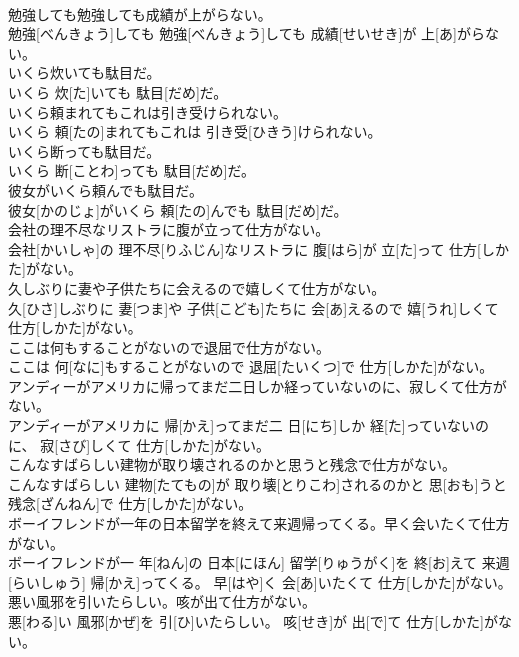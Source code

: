 \documentclass[8pt]{extreport}
\begin{document}
\begin{CJK}{UTF8}{min}
\\	勉強しても勉強しても成績が上がらない。	
\\	勉強[べんきょう]しても 勉強[べんきょう]しても 成績[せいせき]が 上[あ]がらない。
\\	いくら炊いても駄目だ。	
\\	いくら 炊[た]いても 駄目[だめ]だ。
\\	いくら頼まれてもこれは引き受けられない。	
\\	いくら 頼[たの]まれてもこれは 引き受[ひきう]けられない。
\\	いくら断っても駄目だ。	
\\	いくら 断[ことわ]っても 駄目[だめ]だ。
\\	彼女がいくら頼んでも駄目だ。	
\\	彼女[かのじょ]がいくら 頼[たの]んでも 駄目[だめ]だ。
\\	会社の理不尽なリストラに腹が立って仕方がない。	
\\	会社[かいしゃ]の 理不尽[りふじん]なリストラに 腹[はら]が 立[た]って 仕方[しかた]がない。
\\	久しぶりに妻や子供たちに会えるので嬉しくて仕方がない。	
\\	久[ひさ]しぶりに 妻[つま]や 子供[こども]たちに 会[あ]えるので 嬉[うれ]しくて 仕方[しかた]がない。
\\	ここは何もすることがないので退屈で仕方がない。	
\\	ここは 何[なに]もすることがないので 退屈[たいくつ]で 仕方[しかた]がない。
\\	アンディーがアメリカに帰ってまだ二日しか経っていないのに、寂しくて仕方がない。	
\\	アンディーがアメリカに 帰[かえ]ってまだ二 日[にち]しか 経[た]っていないのに、 寂[さび]しくて 仕方[しかた]がない。
\\	こんなすばらしい建物が取り壊されるのかと思うと残念で仕方がない。	
\\	こんなすばらしい 建物[たてもの]が 取り壊[とりこわ]されるのかと 思[おも]うと 残念[ざんねん]で 仕方[しかた]がない。
\\	ボーイフレンドが一年の日本留学を終えて来週帰ってくる。早く会いたくて仕方がない。	
\\	ボーイフレンドが一 年[ねん]の 日本[にほん] 留学[りゅうがく]を 終[お]えて 来週[らいしゅう] 帰[かえ]ってくる。 早[はや]く 会[あ]いたくて 仕方[しかた]がない。
\\	悪い風邪を引いたらしい。咳が出て仕方がない。	
\\	悪[わる]い 風邪[かぜ]を 引[ひ]いたらしい。 咳[せき]が 出[で]て 仕方[しかた]がない。

\end{CJK}
\end{document}
